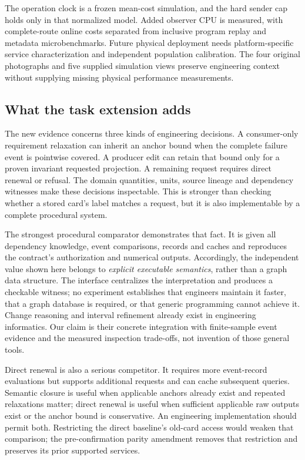The operation clock is a frozen mean-cost simulation, and the hard sender cap holds only in that normalized model. Added observer CPU is measured, with complete-route online costs separated from inclusive program replay and metadata microbenchmarks. Future physical deployment needs platform-specific service characterization and independent population calibration. The four original photographs and five supplied simulation views preserve engineering context without supplying missing physical performance measurements.

\subsection{What the task extension adds}
The new evidence concerns three kinds of engineering decisions. A consumer-only requirement relaxation can inherit an anchor bound when the complete failure event is pointwise covered. A producer edit can retain that bound only for a proven invariant requested projection. A remaining request requires direct renewal or refusal. The domain quantities, units, source lineage and dependency witnesses make these decisions inspectable. This is stronger than checking whether a stored card's label matches a request, but it is also implementable by a complete procedural system.

The strongest procedural comparator demonstrates that fact. It is given all dependency knowledge, event comparisons, records and caches and reproduces the contract's authorization and numerical outputs. Accordingly, the independent value shown here belongs to \emph{explicit executable semantics}, rather than a graph data structure. The interface centralizes the interpretation and produces a checkable witness; no experiment establishes that engineers maintain it faster, that a graph database is required, or that generic programming cannot achieve it. Change reasoning and interval refinement already exist in engineering informatics. Our claim is their concrete integration with finite-sample event evidence and the measured inspection trade-offs, not invention of those general tools.

Direct renewal is also a serious competitor. It requires more event-record evaluations but supports additional requests and can cache subsequent queries. Semantic closure is useful when applicable anchors already exist and repeated relaxations matter; direct renewal is useful when sufficient applicable raw outputs exist or the anchor bound is conservative. An engineering implementation should permit both. Restricting the direct baseline's old-card access would weaken that comparison; the pre-confirmation parity amendment removes that restriction and preserves its prior supported services.

